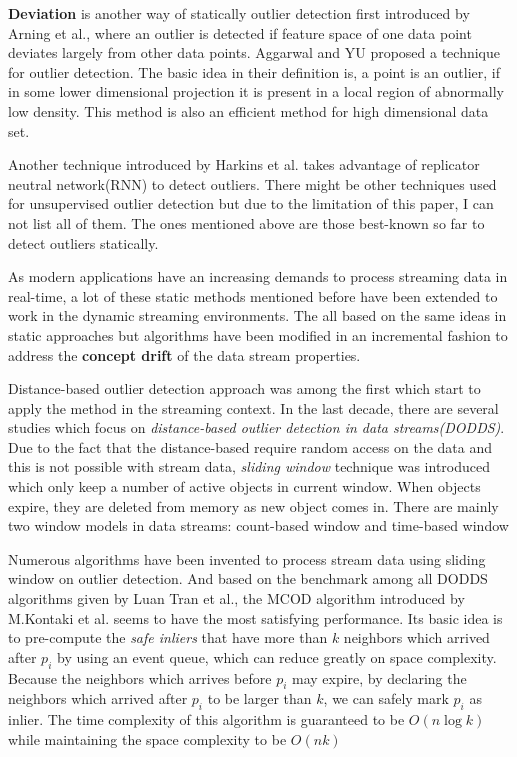 \documentclass[11pt]{article}       %
\begin{document}
\textbf{Deviation} is another way of statically outlier detection first introduced by Arning et al.\cite{A.Arning:deviation}, where an outlier is detected if feature space of one data point deviates largely from other data points. Aggarwal and YU\cite{Aggarwal:2001:ODH:375663.375668} proposed a technique for outlier detection. The basic idea in their definition is, a point is an outlier, if in some lower dimensional projection it is present in a local region of abnormally low density. This method is also an efficient method for high dimensional data set\cite{04666541}. 

Another technique introduced by Harkins et al.\cite{S.Harkins:rnn} takes advantage of replicator neutral network(RNN) to detect outliers. There might be other techniques used for unsupervised outlier detection but due to the limitation of this paper, I can not list all of them. The ones mentioned above are those best-known so far to detect outliers statically.

As modern applications have an increasing demands to process streaming data in real-time, a lot of these static methods mentioned before have been extended to work in the dynamic streaming environments. The all based on the same ideas in static approaches but algorithms have been modified in an incremental fashion to address the \textbf{concept drift} of the data stream properties.

Distance-based outlier detection approach was among the first which start to apply the method in the streaming context. In the last decade, there are several studies which focus on \textit{distance-based outlier detection in data streams(DODDS)}. Due to the fact that the distance-based require random access on the data and this is not possible with stream data, \textit{sliding window} technique was introduced which only keep a number of active objects in current window. When objects expire, they are deleted from memory as new object comes in. There are mainly two window models in data streams: count-based window and time-based window

Numerous algorithms have been invented to process stream data using sliding window on outlier detection. And based on the benchmark among all DODDS algorithms given by Luan Tran et al.\cite{Tran:2016:DOD:2994509.2994526}, the MCOD algorithm introduced by M.Kontaki et al.\cite{5767923} seems to have the most satisfying performance. Its basic idea is to pre-compute the \textit{safe inliers} that have more than $k$ neighbors which arrived after $p_{i}$ by using an event queue, which can reduce greatly on space complexity. Because the neighbors which arrives before $p_{i}$ may expire, by declaring the neighbors which arrived after $p_{i}$ to be larger than $k$, we can safely mark $p_{i}$ as inlier. The time complexity of this algorithm is guaranteed to be $O(n\log{k})$ while maintaining the space complexity to be $O(nk)$
\end{document}
